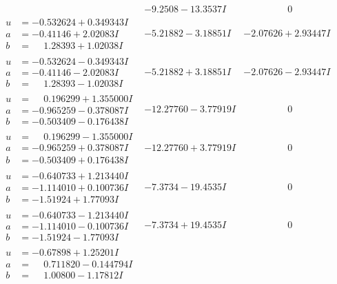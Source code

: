 \documentclass[1p]{elsarticle_modified}
\theoremstyle{definition}
\begin{document}
$$\begin{array}{c|c|c}
 & -9.2508 - 13.3537 I & \phantom{-0.000000 } 0 \\ \hline\begin{aligned}
u &= -0.532624 + 0.349343 I \\
a &= -0.41146 + 2.02083 I \\
b &= \phantom{-}1.28393 + 1.02038 I\end{aligned}
 & -5.21882 - 3.18851 I & -2.07626 + 2.93447 I \\ \hline\begin{aligned}
u &= -0.532624 - 0.349343 I \\
a &= -0.41146 - 2.02083 I \\
b &= \phantom{-}1.28393 - 1.02038 I\end{aligned}
 & -5.21882 + 3.18851 I & -2.07626 - 2.93447 I \\ \hline\begin{aligned}
u &= \phantom{-}0.196299 + 1.355000 I \\
a &= -0.965259 - 0.378087 I \\
b &= -0.503409 - 0.176438 I\end{aligned}
 & -12.27760 - 3.77919 I & \phantom{-0.000000 } 0 \\ \hline\begin{aligned}
u &= \phantom{-}0.196299 - 1.355000 I \\
a &= -0.965259 + 0.378087 I \\
b &= -0.503409 + 0.176438 I\end{aligned}
 & -12.27760 + 3.77919 I & \phantom{-0.000000 } 0 \\ \hline\begin{aligned}
u &= -0.640733 + 1.213440 I \\
a &= -1.114010 + 0.100736 I \\
b &= -1.51924 + 1.77093 I\end{aligned}
 & -7.3734 - 19.4535 I & \phantom{-0.000000 } 0 \\ \hline\begin{aligned}
u &= -0.640733 - 1.213440 I \\
a &= -1.114010 - 0.100736 I \\
b &= -1.51924 - 1.77093 I\end{aligned}
 & -7.3734 + 19.4535 I & \phantom{-0.000000 } 0 \\ \hline\begin{aligned}
u &= -0.67898 + 1.25201 I \\
a &= \phantom{-}0.711820 - 0.144794 I \\
b &= \phantom{-}1.00800 - 1.17812 I\end{aligned}

\end{array}$$
\end{document}
